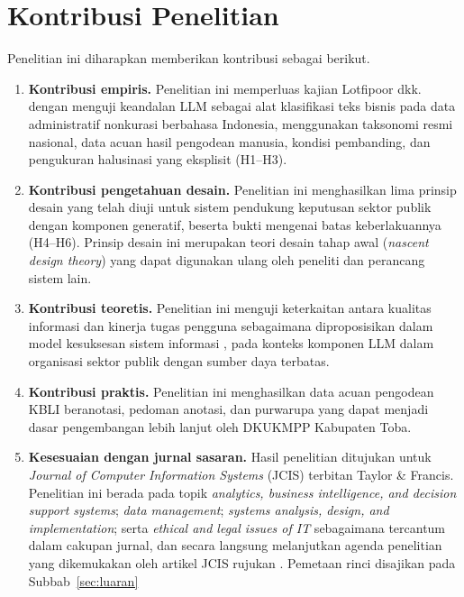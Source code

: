 \documentclass[12pt,a4paper]{report}
\begin{document}
\section{Kontribusi Penelitian}
\label{sec:kontribusi}

Penelitian ini diharapkan memberikan kontribusi sebagai berikut.
\begin{enumerate}
  \item \textbf{Kontribusi empiris.} Penelitian ini memperluas kajian Lotfipoor dkk. \cite{lotfipoor2026llm} dengan menguji keandalan LLM sebagai alat klasifikasi teks bisnis pada data administratif nonkurasi berbahasa Indonesia, menggunakan taksonomi resmi nasional, data acuan hasil pengodean manusia, kondisi pembanding, dan pengukuran halusinasi yang eksplisit (H1--H3).
  \item \textbf{Kontribusi pengetahuan desain.} Penelitian ini menghasilkan lima prinsip desain yang telah diuji untuk sistem pendukung keputusan sektor publik dengan komponen generatif, beserta bukti mengenai batas keberlakuannya (H4--H6). Prinsip desain ini merupakan teori desain tahap awal (\textit{nascent design theory}) yang dapat digunakan ulang oleh peneliti dan perancang sistem lain.
  \item \textbf{Kontribusi teoretis.} Penelitian ini menguji keterkaitan antara kualitas informasi dan kinerja tugas pengguna sebagaimana diproposisikan dalam model kesuksesan sistem informasi \cite{delone2003success}, pada konteks komponen LLM dalam organisasi sektor publik dengan sumber daya terbatas.
  \item \textbf{Kontribusi praktis.} Penelitian ini menghasilkan data acuan pengodean KBLI beranotasi, pedoman anotasi, dan purwarupa yang dapat menjadi dasar pengembangan lebih lanjut oleh DKUKMPP Kabupaten Toba.
  \item \textbf{Kesesuaian dengan jurnal sasaran.} Hasil penelitian ditujukan untuk \textit{Journal of Computer Information Systems} (JCIS) terbitan Taylor \& Francis. Penelitian ini berada pada topik \textit{analytics, business intelligence, and decision support systems}; \textit{data management}; \textit{systems analysis, design, and implementation}; serta \textit{ethical and legal issues of IT} sebagaimana tercantum dalam cakupan jurnal, dan secara langsung melanjutkan agenda penelitian yang dikemukakan oleh artikel JCIS rujukan \cite{lotfipoor2026llm}. Pemetaan rinci disajikan pada Subbab~\ref{sec:luaran}
\end{enumerate}

\end{document}
